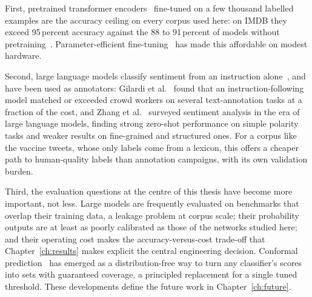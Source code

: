 First, pretrained transformer encoders~\cite{devlin2019,liu2019} fine-tuned on a few thousand labelled examples are the accuracy ceiling on every corpus used here: on IMDB they exceed 95\,percent accuracy against the 88 to 91\,percent of models without pretraining~\cite{maas2011,wang2012}. Parameter-efficient fine-tuning~\cite{hu2022} has made this affordable on modest hardware.

Second, large language models classify sentiment from an instruction alone~\cite{brown2020}, and have been used as annotators: Gilardi et al.~\cite{gilardi2023} found that an instruction-following model matched or exceeded crowd workers on several text-annotation tasks at a fraction of the cost, and Zhang et al.~\cite{zhang2023} surveyed sentiment analysis in the era of large language models, finding strong zero-shot performance on simple polarity tasks and weaker results on fine-grained and structured ones. For a corpus like the vaccine tweets, whose only labels come from a lexicon, this offers a cheaper path to human-quality labels than annotation campaigns, with its own validation burden.

Third, the evaluation questions at the centre of this thesis have become more important, not less. Large models are frequently evaluated on benchmarks that overlap their training data, a leakage problem at corpus scale; their probability outputs are at least as poorly calibrated as those of the networks studied here; and their operating cost makes the accuracy-versus-cost trade-off that Chapter~\ref{ch:results} makes explicit the central engineering decision. Conformal prediction~\cite{angelopoulos2023} has emerged as a distribution-free way to turn any classifier's scores into sets with guaranteed coverage, a principled replacement for a single tuned threshold. These developments define the future work in Chapter~\ref{ch:future}.
